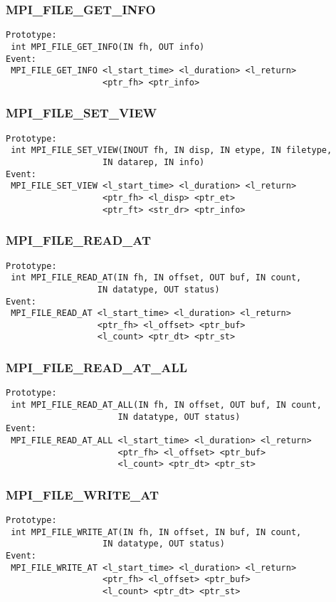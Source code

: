 \documentclass[9pt]{article}
\begin{document}
\subsubsection{MPI\_FILE\_GET\_INFO}
\label{sec:MPIFILEGETINFO}
\begin{verbatim}
Prototype:
 int MPI_FILE_GET_INFO(IN fh, OUT info)
Event:
 MPI_FILE_GET_INFO <l_start_time> <l_duration> <l_return>
                   <ptr_fh> <ptr_info>
\end{verbatim}

\subsubsection{MPI\_FILE\_SET\_VIEW}
\label{sec:MPIFILESETVIEW}
\begin{verbatim}
Prototype:
 int MPI_FILE_SET_VIEW(INOUT fh, IN disp, IN etype, IN filetype, 
                   IN datarep, IN info)
Event:
 MPI_FILE_SET_VIEW <l_start_time> <l_duration> <l_return>
                   <ptr_fh> <l_disp> <ptr_et> 
                   <ptr_ft> <str_dr> <ptr_info>
\end{verbatim}

\subsubsection{MPI\_FILE\_READ\_AT}
\label{sec:MPIFILEREADAT}
\begin{verbatim}
Prototype:
 int MPI_FILE_READ_AT(IN fh, IN offset, OUT buf, IN count, 
                  IN datatype, OUT status)
Event:
 MPI_FILE_READ_AT <l_start_time> <l_duration> <l_return>
                  <ptr_fh> <l_offset> <ptr_buf>
                  <l_count> <ptr_dt> <ptr_st>
\end{verbatim}

\subsubsection{MPI\_FILE\_READ\_AT\_ALL}
\label{sec:MPIFILEREADATALL}
\begin{verbatim}
Prototype:
 int MPI_FILE_READ_AT_ALL(IN fh, IN offset, OUT buf, IN count, 
                      IN datatype, OUT status)
Event:
 MPI_FILE_READ_AT_ALL <l_start_time> <l_duration> <l_return>
                      <ptr_fh> <l_offset> <ptr_buf>
                      <l_count> <ptr_dt> <ptr_st>
\end{verbatim}

\subsubsection{MPI\_FILE\_WRITE\_AT}
\label{sec:MPIFILEWRITEAT}
\begin{verbatim}
Prototype:
 int MPI_FILE_WRITE_AT(IN fh, IN offset, IN buf, IN count, 
                   IN datatype, OUT status)
Event:
 MPI_FILE_WRITE_AT <l_start_time> <l_duration> <l_return>
                   <ptr_fh> <l_offset> <ptr_buf>
                   <l_count> <ptr_dt> <ptr_st>
\end{verbatim}
\end{document}
